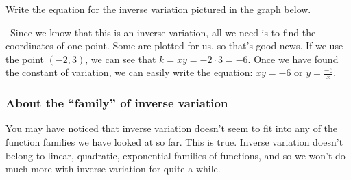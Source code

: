 \begin{boxex}
Write the equation for the inverse variation pictured in the graph below.

\begin{center}
\end{center}


\exsoln\ Since we know that this is an inverse variation, all we need is to find the coordinates of one point. Some are plotted for us, so that's good news. If we use the point $(-2, 3)$, we can see that $k = xy = -2\cdot3 = -6$. Once we have found the constant of variation, we can easily write the equation: $xy=-6$ or $y=\frac{-6}{x}$.
\end{boxex}

\subsubsection{About the ``family'' of inverse variation}

You may have noticed that inverse variation doesn't seem to fit into any of the function families we have looked at so far. This is true. Inverse variation doesn't belong to linear, quadratic, exponential families of functions, and so we won't do much more with inverse variation for quite a while.


